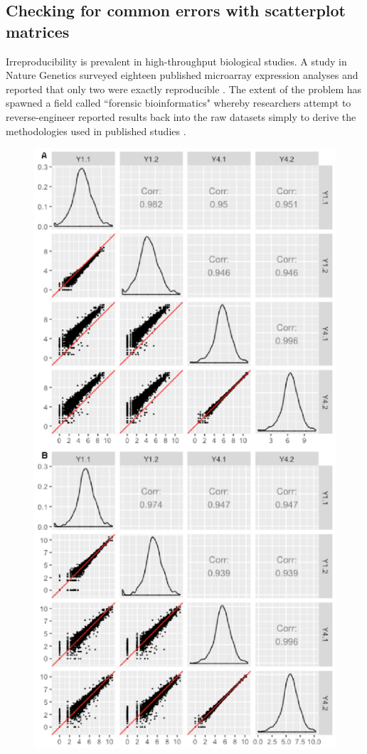 \documentclass{bioinfo}
\begin{document}
\subsection{Checking for common errors with scatterplot matrices}

Irreproducibility is prevalent in high-throughput biological studies. A study in Nature Genetics surveyed eighteen published microarray expression analyses and reported that only two were exactly reproducible \citep{Ioannidis}. The extent of the problem has spawned a field called ``forensic bioinformatics" whereby researchers attempt to reverse-engineer reported results back into the raw datasets simply to derive the methodologies used in published studies \citep{Baggerly}.

\begin{figure}
\includegraphics[width=\linewidth]{yeastWithinBetween.eps}

\end{figure}
\end{document}
